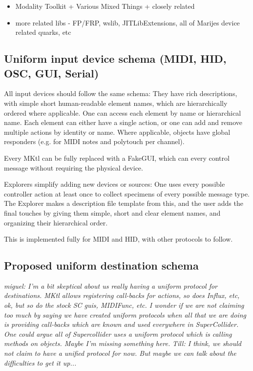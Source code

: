 \documentclass{article}
\begin{document}
\begin{itemize}
	\item Modality Toolkit + Various Mixed Things + closely related
	\item more related libs - FP/FRP, wslib, JITLibExtensions, 
		all of Marijes device related quarks, etc 
\end{itemize}

\subsection{ Uniform input device schema (MIDI, HID, OSC, GUI, Serial) }

All input devices should follow the same schema: 
They have rich descriptions, with simple short human-readable element names, which are hierarchically ordered where applicable. 
One can access each element by name or hierarchical name.
Each element can either have a single action, or one can add and remove multiple actions by identity or name.
Where applicable, objects have global responders (e.g. for MIDI notes and polytouch per channel). 

Every MKtl can be fully replaced with a FakeGUI, which can every control message without requiring the physical device.

Explorers simplify adding new devices or sources: 
One uses every possible controller action at least once to collect specimens of every possible message type. 
The Explorer makes a description file template from this, and the user adds the final touches by giving them simple, short and clear element names, and organizing their hierarchical order.

This is implemented fully for MIDI and HID, with other protocols to follow.

\subsection{Proposed uniform destination schema}

\emph{ miguel: I'm a bit skeptical about us really having a uniform protocol for destinations. MKtl allows registering call-backs for actions, so does Influx, etc, ok, but so do the stock SC guis, MIDIFunc, etc.  I wonder if we are not claiming too much by saying we have created uniform protocols when all that we are doing is providing call-backs which are known and used everywhere in SuperCollider. One could argue all of Supercollider uses a uniform protocol which is calling methods on objects. Maybe I'm missing something here.
}
\emph{Till: I think, we should not claim to have a unified protocol for now. But maybe we can talk about the difficulties to get it up...}
 
\end{document}
